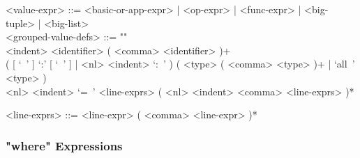 \documentclass{article}
\begin{document}
\begin{itemize}
\begin{grammar}
<value-expr> ::=
<basic-or-app-expr> | <op-expr> | <func-expr> | <big-tuple> | <big-list>
\\

<grouped-value-defs> ::= ""\\
<indent> <identifier> ( <comma> <identifier> )+ \\
( [ `\ ' ] `:' [ `\ ' ] | <nl> <indent> `:\ ' )
( <type> ( <comma> <type> )+ | `all\ ' <type> ) \\
<nl> <indent> `=\ ' <line-exprs> ( <nl> <indent> <comma> <line-exprs> )*

<line-exprs> ::= <line-expr> ( <comma> <line-expr> )*
\end{grammar}

\end{itemize}

\newpage

\subsubsection{"where" Expressions}
\label{subsubsec:whereexprs}
\end{document}
